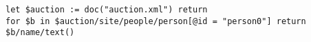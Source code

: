 \begin{lstlisting}[captionpos=b, caption={The defined nodes in the model}, label=xmatrk-q1] 
let $auction := doc("auction.xml") return
for $b in $auction/site/people/person[@id = "person0"] return $b/name/text()
\end{lstlisting} 